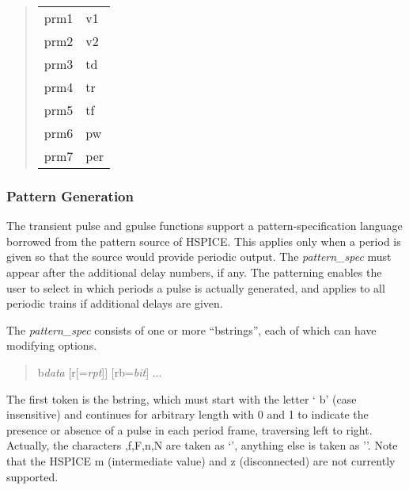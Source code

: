 \begin{quote}
\begin{tabular}{ll}
prm1 & v1\\
prm2 & v2\\
prm3 & td\\
prm4 & tr\\
prm5 & tf\\
prm6 & pw\\
prm7 & per\\
\end{tabular}
\end{quote}

\subsubsection{Pattern Generation}
\label{pattern}

The transient {\vt pulse} and {\vt gpulse} functions support a
pattern-specification language borrowed from the pattern source of
HSPICE.  This applies only when a period is given so that the source
would provide periodic output.  The {\it pattern\_spec} must appear
after the additional delay numbers, if any.  The patterning enables
the user to select in which periods a pulse is actually generated, and
applies to all periodic trains if additional delays are given.

The {\it pattern\_spec} consists of one or more ``bstrings'', each of
which can have modifying options.

\begin{quote}
{\vt b}{\it data} [{\vt r}[{\vt =}{\it rpt\/}]] [{\vt rb}{\vt =}{\it bit\/}] ...
\end{quote}

The first token is the bstring, which must start with the letter `{\vt
b}' (case insensitive) and continues for arbitrary length with 0 and 1
to indicate the presence or absence of a pulse in each period frame,
traversing left to right.  Actually, the characters {,f,F,n,N}
are taken as `{}', anything else is taken as '{}'.  Note
that the HSPICE {\vt m} (intermediate value) and {\vt z}
(disconnected) are not currently supported.

